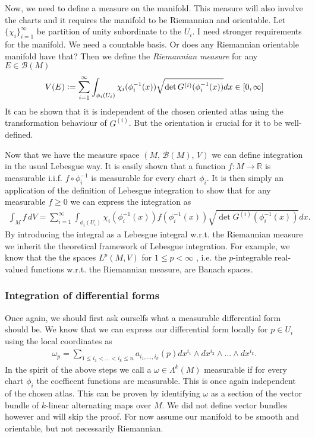 \documentclass[12pt,a4paper]{article}
\numberwithin{equation}{subsection}
\numberwithin{lemma}{subsection}
\theoremstyle{definition}
\newcommand{\real}{\mathbb{R}}
\begin{document}
Now, we need to define a measure on the manifold. This measure will 
also involve the charts and it requires the manifold to be Riemannian 
and orientable. Let $\{ \chi_i \}_{i=1}^\infty$ be partition of unity 
subordinate to the $U_i$. {\color{red} I need stronger 
requirements for the manifold. We need a countable basis. Or does any 
Riemannian orientable manifold have that?}  Then we define the 
\textit{Riemannian measure} for any $E \in \mathcal{B}(M)$
\begin{align*}
    V(E) \vcentcolon= \sum\limits_{i=1}^\infty \int_{\phi_i(U_i)}
        \chi_i(\phi_i^{-1}(x)) \sqrt{\det G^{(i)}(\phi_i^{-1}(x))} dx 
        \in [0,\infty]
\end{align*}
It can be shown that it is independent of the chosen oriented atlas 
using the transformation behaviour of $G^{(i)}$. But the orientation is 
crucial for it to be well-defined. 

Now that we have the measure space $(M, \, \mathcal{B}(M), \, V)$
we can define integration in the usual Lebesgue way.
It is easily shown that a function $f: M \rightarrow \real$ is measurable 
i.i.f. $f \circ \phi_i^{-1}$ is measurable for every chart $\phi_i$. 
It is then simply an application of the definition of Lebesgue integration to
show that for any measurable $f \geq 0$ we can express the integration as
\begin{align*}
    \int_M f \, dV = \sum\limits_{i=1}^\infty \int_{\phi_i(U_i)} 
        \chi_i(\phi_i^{-1}(x)) f(\phi_i^{-1}(x)) 
        \sqrt{\det G^{(i)}(\phi_i^{-1}(x))} dx.
\end{align*}
By introducing the integral as a Lebesgue integral w.r.t. the Riemannian 
measure we inherit the theoretical framework of Lebesgue integration. 
For example, we know that the the spaces $L^p(M,V)$ for $1\leq p < \infty$
, i.e. the $p$-integrable 
real-valued functions w.r.t. the Riemannian measure, are Banach spaces.

\subsubsection{Integration of differential forms}

Once again, we should first ask ourselfs what a measurable differential form 
should be. We know that we can express our differential form locally 
for $p \in U_i$ using the local coordinates as 
\begin{align*}
    \omega_p = \sum\limits_{1\leq i_1 < ... < i_k \leq n} 
        a_{i_1,...,i_k}(p) dx^{i_1} \wedge dx^{i_2} \wedge ... \wedge dx^{i_k}.
\end{align*}
In the spirit of the above steps we call a $\omega \in \Lambda^k (M)$
measurable if for every chart $\phi_i$ the coefficent functions 
are measurable. This is once again independent of the chosen atlas. 
This can be proven by identifying $\omega$ as a section of the vector bundle 
of $k$-linear alternating maps over $M$. We did not define vector bundles
however and will skip the proof.
For now assume our manifold to be smooth and orientable, but not necessarily
Riemannian.
\end{document}

